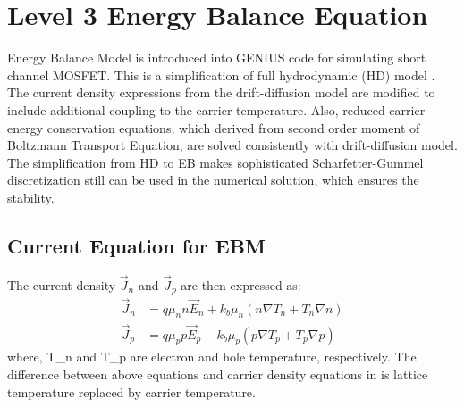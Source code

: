 \documentclass[oneside,12pt]{cgd_book}
\begin{document}
\section[sec:Equation:EBML3]{Level 3 Energy Balance Equation}
\label{EBML3+Equation}Energy Balance Model \cite{PISCES-2ET}
is introduced into GENIUS code for simulating
      short channel MOSFET. This is a simplification of full hydrodynamic (HD) model
\cite{Aste2003}. The
      current density expressions from the drift-diffusion model are modified to include additional coupling to the
      carrier temperature. Also, reduced carrier energy conservation equations, which derived from second order moment
      of Boltzmann Transport Equation, are solved consistently with drift-diffusion model. The simplification from HD to
      EB makes sophisticated Scharfetter-Gummel discretization still can be used in the numerical solution, which
      ensures the stability.
\par
\subsection{Current Equation for EBM}\label{Drift-diffusion current+EBML3}The current density
$\vec{J}_n$ and $\vec{J}_p$ are then expressed as:
\begin{subequations}
\begin{align}
 \vec{J}_n & = q\mu_n n \vec{E}_n + k_b \mu_n \left( {n\nabla T_n + T_n \nabla n} \right)\\
 \vec{J}_p  &= q\mu_p p \vec{E}_p - k_b \mu_p \left( {p\nabla T_p + T_p \nabla p} \right)
\end{align}
\end{subequations}
where, \textdollar{}T\_n\textdollar{} and \textdollar{}T\_p\textdollar{} are electron and hole temperature, respectively. The difference between above
      equations and carrier density equations in 
is lattice temperature replaced by carrier
      temperature.
\par
\end{document}
